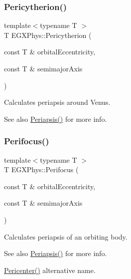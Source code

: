 \subsubsection{\texorpdfstring{Pericytherion()}{Pericytherion()}}
{\footnotesize\ttfamily template$<$typename T $>$ \\
T E\+G\+X\+Phys\+::\+Pericytherion (\begin{DoxyParamCaption}\item[{const T \&}]{orbital\+Eccentricity,  }\item[{const T \&}]{semimajor\+Axis }\end{DoxyParamCaption})}



Calculates periapsis around Venus. 

\begin{DoxySeeAlso}{See also}
\hyperlink{group___astrophysics_ga4414ac75539371ec874a3d25cad6c9fe}{Periapsis()} for more info. 
\end{DoxySeeAlso}
\mbox{\label{group___astrophysics_gaff62669fb364a245cb85f9a91d8ea71f}} 
\subsubsection{\texorpdfstring{Perifocus()}{Perifocus()}}
{\footnotesize\ttfamily template$<$typename T $>$ \\
T E\+G\+X\+Phys\+::\+Perifocus (\begin{DoxyParamCaption}\item[{const T \&}]{orbital\+Eccentricity,  }\item[{const T \&}]{semimajor\+Axis }\end{DoxyParamCaption})}



Calculates periapsis of an orbiting body. 

\begin{DoxySeeAlso}{See also}
\hyperlink{group___astrophysics_ga4414ac75539371ec874a3d25cad6c9fe}{Periapsis()} for more info. 

\hyperlink{group___astrophysics_gac4c419a87a5802cf6afc98f50792e99f}{Pericenter()} alternative name. 
\end{DoxySeeAlso}
\mbox{\label{group___astrophysics_ga074fecab96b90bebffa512a37e52d90b}} 
